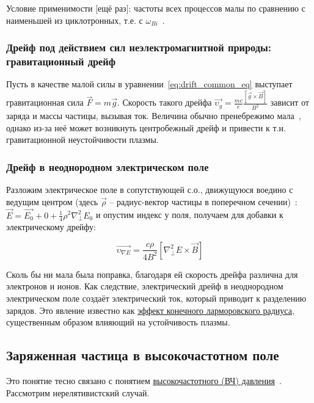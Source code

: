 \documentclass[10pt, a4paper]{article}
\begin{document}
Условие применимости [ещё раз]: частоты всех процессов малы по сравнению с наименьшей из циклотронных, т.е. с $\omega_{Bi}$~\cite{frank}.

\subsubsection{Дрейф под действием сил неэлектромагнитной природы: гравитационный дрейф}

Пусть в качестве малой силы в уравнении~\eqref{eq:drift_common_eq} выступает гравитационная сила $\vec{F}=m\vec{g}$. Скорость такого дрейфа $\overrightarrow{\upsilon_g}=\frac{mc}{e}\frac{\left[\vec{g}\times\vec{B}\right]}{B^2}$ зависит от заряда и массы частицы, вызывая ток. Величина обычно пренебрежимо мала~\cite{kotelnikov}, однако из-за неё может возникнуть центробежный дрейф и привести к т.н. гравитационной неустойчивости плазмы.

\subsubsection{Дрейф в неоднородном электрическом поле}

Разложим электрическое поле в сопутствующей с.о., движущуюся воедино с ведущим центром (здесь $\vec{\rho}$ -- радиус-вектор частицы в поперечном сечении)~\cite{kotelnikov}: $\vec{E} = \overrightarrow{E_0}+0+\frac{1}{4}\rho^2\nabla_\perp^2E_0$ и опустим индекс у поля, получаем для добавки к электрическому дрейфу:

\begin{equation*}
	\overrightarrow{\upsilon_{\nabla E}} = \frac{c\rho}{4B^2}\left[\nabla_\perp^2E\times\vec{B}\right]
\end{equation*}

Сколь бы ни мала была поправка, благодаря ей скорость дрейфа различна для
электронов и ионов. Как следствие, электрический дрейф в неоднородном электрическом поле создаёт электрический ток, который
приводит к разделению зарядов. Это явление известно как \uline{эффект
конечного ларморовского радиуса}, существенным
образом влияющий на устойчивость плазмы.

\subsection{Заряженная частица в высокочастотном поле} \label{subsec:RF_pressure}

Это понятие тесно связано с понятием \uline{высокочастотного (ВЧ) давления}~\cite{chen}. Рассмотрим нерелятивистский случай.
\end{document}
